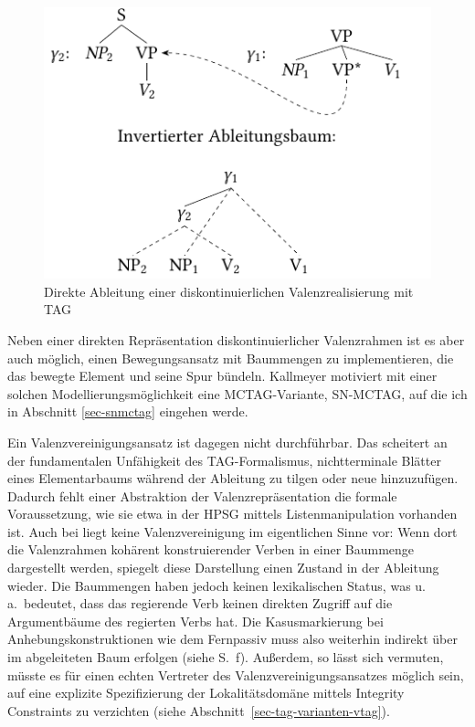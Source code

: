 \begin{figure}
\centering
\includegraphics[angle=90]{graphics/abb65.pdf}
\caption{\label{fig-kohaerenz-strategien-3}Direkte Ableitung einer diskontinuierlichen Valenzrealisierung mit TAG}
\end{figure}

Neben einer direkten Repräsentation diskontinuierlicher Valenzrahmen ist es aber auch möglich, einen Bewegungsansatz mit Baummengen zu implementieren, die das bewegte Element und seine Spur bündeln. Kallmeyer motiviert mit einer solchen Modellierungsmöglichkeit eine MCTAG-Variante, SN-MCTAG, auf die ich in Abschnitt \ref{sec-snmctag} eingehen werde. 

Ein Valenzvereinigungsansatz ist dagegen nicht durchführbar. Das scheitert an der fundamentalen Unfähigkeit des TAG-Formalismus, nichtterminale Blätter eines Elementarbaums während der Ableitung zu tilgen oder neue hinzuzufügen. Dadurch fehlt einer Abstraktion der Valenzrepräsentation die formale Voraussetzung, wie sie etwa in der HPSG mittels Listenmanipulation vorhanden ist. Auch bei \citet[171]{Rambow:94} liegt keine Valenzvereinigung im eigentlichen Sinne vor: Wenn dort die Valenzrahmen kohärent konstruierender Verben in einer Baummenge dargestellt werden, spiegelt diese Darstellung  einen Zustand in der Ableitung wieder. Die Baummengen haben jedoch keinen lexikalischen Status, was u.\,a.\ bedeutet, dass das regierende Verb keinen direkten Zugriff auf die Argumentbäume des regierten Verbs hat. Die Kasusmarkierung bei Anhebungskonstruktionen wie dem Fernpassiv muss also weiterhin indirekt über  im abgeleiteten Baum erfolgen (siehe S.~\pageref{sec-ttmctag-fern}f). Au\ss erdem, so lässt sich vermuten, müsste es für einen echten Vertreter des Valenzvereinigungsansatzes möglich sein, auf eine explizite Spezifizierung der Lokalitätsdomäne mittels Integrity Constraints zu verzichten (siehe Abschnitt~\ref{sec-tag-varianten-vtag}).



